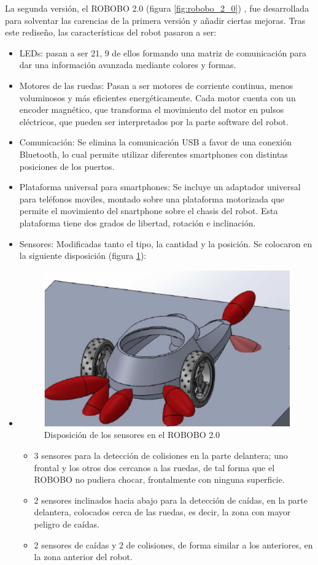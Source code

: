 La segunda versión, el ROBOBO 2.0 (figura \ref{fig:robobo_2_0}) , fue desarrollada para solventar las carencias de la primera versión y añadir ciertas mejoras. Tras este rediseño, las características del robot pasaron a ser:

\begin{itemize}
	\item LEDs: pasan a ser 21, 9 de ellos formando una matriz de comunicación para dar una información avanzada mediante colores y formas.
	\item Motores de las ruedas: Pasan a ser motores de corriente continua, menos voluminosos y más eficientes energéticamente. Cada motor cuenta con un encoder magnético, que transforma el movimiento del motor en pulsos eléctricos, que pueden ser interpretados por la parte software del robot.
	\item Comunicación: Se elimina la comunicación USB a favor de una conexión Bluetooth, lo cual permite utilizar diferentes smartphones con distintas posiciones de los puertos.
	\item Plataforma universal para smartphones: Se incluye un adaptador universal para teléfonos moviles, montado sobre una plataforma motorizada que permite el movimiento del snartphone sobre el chasis del robot. Esta plataforma tiene dos grados de libertad, rotación e inclinación.
	\item Sensores: Modificadas tanto el tipo, la cantidad y la posición. Se colocaron en la siguiente disposición (figura \ref{fig:robobo_2_0_sensors}):
	\item \begin{figure}
	\centering
	\includegraphics[width=0.8\linewidth]{imagenes/robobo_2_sensors.png}
	\caption{Disposición de los sensores en el ROBOBO 2.0}
	\label{fig:robobo_2_0_sensors}
\end{figure} 
	\begin{itemize}
	\item 3 sensores para la detección de colisiones en la parte delantera; uno frontal y los otros dos cercanos a las ruedas, de tal forma que el ROBOBO no pudiera chocar, frontalmente con ninguna superficie.
	\item 2 sensores inclinados hacia abajo para la detección de caídas, en la parte delantera, colocados cerca de las ruedas, es decir, la zona con mayor peligro de caídas.
	\item 2 sensores de caídas y 2 de colisiones, de forma similar a los anteriores, en la zona anterior del robot. 
	

\end{itemize}
\end{itemize}
